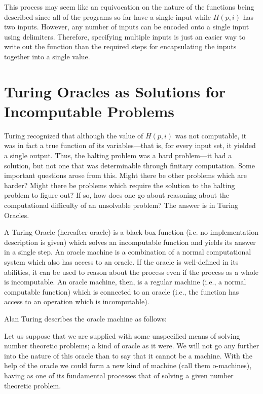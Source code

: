 This process may seem like an equivocation on the nature of the functions being described
since all of the programs so far have a single input while $H(p, i)$ has two inputs.  However, any number of inputs can be encoded onto a single input using delimiters.  Therefore, specifying multiple inputs is just an easier way to write out the function than the required steps for encapsulating the inputs together into a single value.

\section[Turing Oracles as Solutions]{Turing Oracles as Solutions for Incomputable Problems}

Turing recognized that although the value of $H(p, i)$ was not computable, it was in fact a true function of its variables---that is, for every input set, it yielded a single output.  Thus, the halting problem was a hard problem---it had a solution, but not one that was determinable through finitary computation.  Some important questions arose from this.  Might there be other problems which are harder?  Might there be problems which require the solution to the halting problem to figure out?  If so, how does one go about reasoning about the computational difficulty of an unsolvable problem?  The answer is in Turing Oracles.

A Turing Oracle (hereafter oracle) is a black-box function (i.e. no implementation description is given) which solves an incomputable function and yields its answer in a single step.  An oracle machine is a combination of a normal computational system which also has access to an oracle.  If the oracle is well-defined in its abilities, it can be used to reason about the process even if the process as a whole is incomputable.  An oracle machine, then, is a regular machine (i.e., a normal computable function) which is connected to an oracle (i.e., the function has access to an operation which is incomputable).

Alan Turing describes the oracle machine as follows:

\begin{quoting}
Let us suppose that we are supplied with some unspecified means of solving number theoretic problems; a kind of oracle as it were.  We will not go any further into the nature of this oracle than to say that it cannot be a machine.  With the help of the oracle we could form a new kind of machine (call them o-machines), having as one of its fundamental processes that of solving a given number theoretic problem. \citep[][\S{}4]{turing1939}
\end{quoting}

